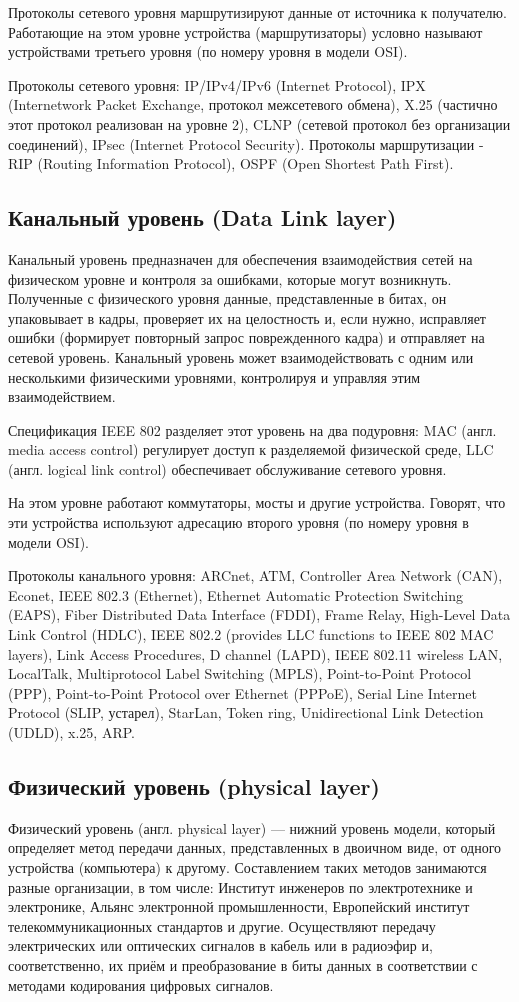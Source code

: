 \documentclass[a4paper,12pt]{article}
\begin{document}
		Протоколы сетевого уровня маршрутизируют данные от источника к получателю. Работающие на этом уровне устройства (маршрутизаторы) условно называют устройствами третьего уровня (по номеру уровня в модели OSI).
		
		Протоколы сетевого уровня: IP/IPv4/IPv6 (Internet Protocol), IPX (Internetwork Packet Exchange, протокол межсетевого обмена), X.25 (частично этот протокол реализован на уровне 2), CLNP (сетевой протокол без организации соединений), IPsec (Internet Protocol Security). Протоколы маршрутизации - RIP (Routing Information Protocol), OSPF (Open Shortest Path First).
		\subsection{Канальный уровень (Data Link layer)}
		Канальный уровень предназначен для обеспечения взаимодействия сетей на физическом уровне и контроля за ошибками, которые могут возникнуть. Полученные с физического уровня данные, представленные в битах, он упаковывает в кадры, проверяет их на целостность и, если нужно, исправляет ошибки (формирует повторный запрос поврежденного кадра) и отправляет на сетевой уровень. Канальный уровень может взаимодействовать с одним или несколькими физическими уровнями, контролируя и управляя этим взаимодействием.
		
		Спецификация IEEE 802 разделяет этот уровень на два подуровня: MAC (англ. media access control) регулирует доступ к разделяемой физической среде, LLC (англ. logical link control) обеспечивает обслуживание сетевого уровня.
		
		На этом уровне работают коммутаторы, мосты и другие устройства. Говорят, что эти устройства используют адресацию второго уровня (по номеру уровня в модели OSI).
		
		Протоколы канального уровня: ARCnet, ATM, Controller Area Network (CAN), Econet, IEEE 802.3 (Ethernet), Ethernet Automatic Protection Switching (EAPS), Fiber Distributed Data Interface (FDDI), Frame Relay, High-Level Data Link Control (HDLC), IEEE 802.2 (provides LLC functions to IEEE 802 MAC layers), Link Access Procedures, D channel (LAPD), IEEE 802.11 wireless LAN, LocalTalk, Multiprotocol Label Switching (MPLS), Point-to-Point Protocol (PPP), Point-to-Point Protocol over Ethernet (PPPoE), Serial Line Internet Protocol (SLIP, устарел), StarLan, Token ring, Unidirectional Link Detection (UDLD), x.25, ARP.
		\subsection{Физический уровень (physical layer)}
		Физический уровень (англ. physical layer) — нижний уровень модели, который определяет метод передачи данных, представленных в двоичном виде, от одного устройства (компьютера) к другому. Составлением таких методов занимаются разные организации, в том числе: Институт инженеров по электротехнике и электронике, Альянс электронной промышленности, Европейский институт телекоммуникационных стандартов и другие. Осуществляют передачу электрических или оптических сигналов в кабель или в радиоэфир и, соответственно, их приём и преобразование в биты данных в соответствии с методами кодирования цифровых сигналов.
		
\end{document}
